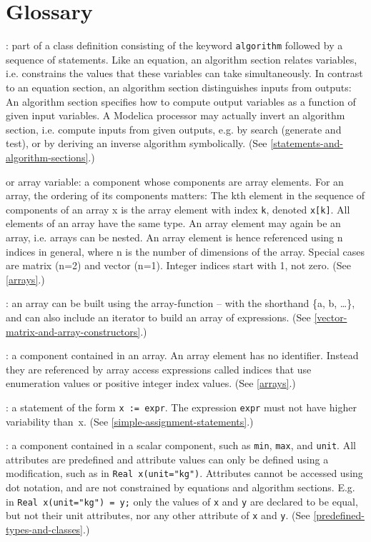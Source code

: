 \chapter{Glossary}
: part of a class definition consisting of the
keyword \lstinline!algorithm! followed by a sequence of statements. Like an
equation, an algorithm section relates variables, i.e. constrains the
values that these variables can take simultaneously. In contrast to an
equation section, an algorithm section distinguishes inputs from
outputs: An algorithm section specifies how to compute output variables
as a function of given input variables. A Modelica processor may
actually invert an algorithm section, i.e. compute inputs from given
outputs, e.g. by search (generate and test), or by deriving an inverse
algorithm symbolically. (See \autoref{statements-and-algorithm-sections}.)

 or array variable: a component whose components are array
elements. For an array, the ordering of its components matters: The kth
element in the sequence of components of an array x is the array element
  with index \lstinline!k!, denoted \lstinline!x[k]!. All elements of an array have the same
  type. An array element may again be an array, i.e. arrays can be nested.
An array element is hence referenced using n indices in general, where n
is the number of dimensions of the array. Special cases are matrix (n=2)
and vector (n=1). Integer indices start with 1, not zero. (See \autoref{arrays}.)

: an array can be built using the
array-function -- with the shorthand \{a, b, \ldots{}\}, and can also
include an iterator to build an array of expressions. (See \autoref{vector-matrix-and-array-constructors}.)

: a component contained in an array. An array
element has no identifier. Instead they are referenced by array access
expressions called indices that use enumeration values or positive
integer index values. (See \autoref{arrays}.)

: a statement of the form \lstinline!x := expr!. The expression
\lstinline!expr! must not have higher variability than~x. (See \autoref{simple-assignment-statements}.)

: a component contained in a scalar component, such as
\lstinline!min!, \lstinline!max!, and \lstinline!unit!. All attributes are predefined and attribute values
can only be defined using a modification, such as in \lstinline!Real x(unit="kg")!.
Attributes cannot be accessed using dot notation, and are not
constrained by equations and algorithm sections. E.g. in \lstinline!Real x(unit="kg") = y;! only the values of \lstinline!x! and
\lstinline!y! are declared to be equal,
but not their unit attributes, nor any other attribute of \lstinline!x! and \lstinline!y!. (See
\autoref{predefined-types-and-classes}.)


